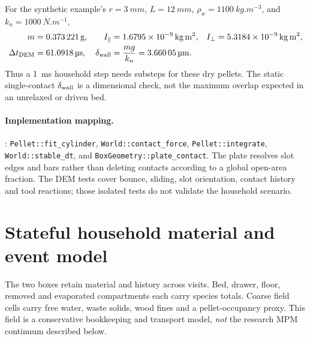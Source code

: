 For the synthetic example's $r=\SI{3}{mm}$, $L=\SI{12}{mm}$,
$\rho_w=\SI{1100}{kg.m^{-3}}$, and $k_n=\SI{1000}{N.m^{-1}}$,
\begin{align}
 m&=\SI{0.373221}{g}, &
 I_\parallel&=\SI{1.6795e-09}{kg.m^2}, &
 I_\perp&=\SI{5.3184e-09}{kg.m^2},\\
 \Delta t_{\rm DEM}&=\SI{61.0918}{\micro s}, &
 \delta_{\rm wall}&=\frac{mg}{k_n}=\SI{3.66005}{\micro m}.
\end{align}
Thus a \SI{1}{ms} household step needs \PelletSubsteps{} substeps for these dry
pellets. The static single-contact $\delta_{\rm wall}$ is a dimensional check,
not the maximum overlap expected in an unrelaxed or driven bed.

\paragraph{Implementation mapping.}
: \nolinkurl{Pellet::fit_cylinder},
\nolinkurl{World::contact_force}, \nolinkurl{Pellet::integrate},
\nolinkurl{World::stable_dt}, and \nolinkurl{BoxGeometry::plate_contact}.
The plate resolves slot edges and bars rather than deleting contacts according
to a global open-area fraction. The DEM tests cover bounce, sliding, slot
orientation, contact history and tool reactions; those isolated tests do not
validate the household scenario.

\section{Stateful household material and event model}
\label{sec:household}
The two boxes retain material and history across visits. Bed, drawer, floor,
removed and evaporated compartments each carry species totals. Coarse field
cells carry free water, waste solids, wood fines and a pellet-occupancy proxy.
This field is a conservative bookkeeping and transport model, \emph{not} the
research MPM continuum described below.

